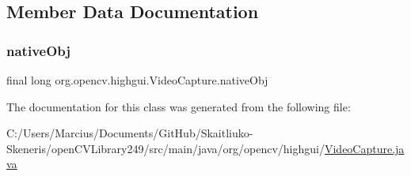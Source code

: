 \subsection{Member Data Documentation}
\mbox{\label{classorg_1_1opencv_1_1highgui_1_1_video_capture_a370c3d9b73ba1c8267f10d77c2ea9d11}} 
\subsubsection{\texorpdfstring{native\+Obj}{nativeObj}}
{\footnotesize\ttfamily final long org.\+opencv.\+highgui.\+Video\+Capture.\+native\+Obj\hspace{0.3cm}{\ttfamily [protected]}}



The documentation for this class was generated from the following file\+:\begin{DoxyCompactItemize}
\item 
C\+:/\+Users/\+Marcius/\+Documents/\+Git\+Hub/\+Skaitliuko-\/\+Skeneris/open\+C\+V\+Library249/src/main/java/org/opencv/highgui/\mbox{\hyperlink{_video_capture_8java}{Video\+Capture.\+java}}\end{DoxyCompactItemize}
